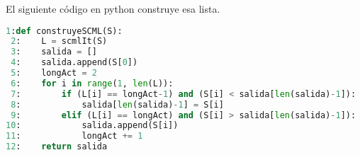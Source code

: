 \documentclass{article}
\begin{document}
El siguiente código en python construye esa lista.

\begin{lstlisting}[language=Python]
 1:def construyeSCML(S):
 2:    L = scmlIt(S)
 3:    salida = []
 4:    salida.append(S[0])
 5:    longAct = 2
 6:    for i in range(1, len(L)):
 7:        if (L[i] == longAct-1) and (S[i] < salida[len(salida)-1]):
 8:            salida[len(salida)-1] = S[i]
 9:        elif (L[i] == longAct) and (S[i] > salida[len(salida)-1]):
10:            salida.append(S[i])
11:            longAct += 1
12:    return salida
\end{lstlisting}
\end{document}
